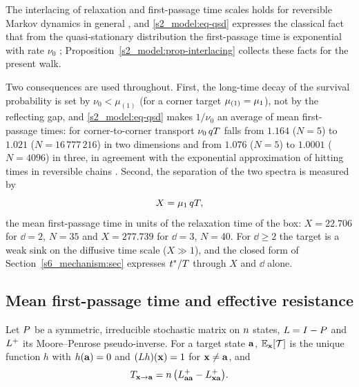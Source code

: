 The interlacing of relaxation and first-passage time scales holds for reversible Markov dynamics in general
\citep{HartichGodec2018,HartichGodec2019}, and \eqref{s2_model:eq-qsd} expresses the classical fact that from the
quasi-stationary distribution the first-passage time is exponential with rate $\nu_0$ \citep{AldousFill};
Proposition~\ref{s2_model:prop-interlacing} collects these facts for the present walk.

Two consequences are used throughout. First, the long-time decay of the survival probability is set by $\nu_0<\mu_{(1)}$
(for a corner target $\mu_{(1)}=\mu_{1}$), not by the reflecting gap, and \eqref{s2_model:eq-qsd} makes $1/\nu_0$ an average of mean first-passage times: for
corner-to-corner transport $\nu_0\,qT$ falls from $1.164$ ($N=5$) to $1.021$ ($N=16\,777\,216$) in two dimensions
and from $1.076$ ($N=5$) to $1.0001$ ($N=4096$) in three, in agreement with the exponential approximation of hitting
times in reversible chains \citep{AldousBrown1992,AldousFill}.
Second, the separation of the two spectra is measured by
\[
  X=\mu_{1}\,qT ,
\]
the mean first-passage time in units of the relaxation time of the box: $X=22.706$ for $\dd=2$, $N=35$ and
$X=277.739$ for $\dd=3$, $N=40$.
For $\dd\ge2$ the target is a weak sink on the diffusive time scale ($X\gg1$), and the closed form of
Section~\ref{s6_mechanism:sec} expresses $t^{*}/T$ through $X$ and $\dd$ alone.

\subsection{Mean first-passage time and effective resistance}\label{s2_model:ssec-pinv}

\begin{proposition}\label{s2_model:prop-pinv}
Let $P$ be a symmetric, irreducible stochastic matrix on $n$ states, $L=I-P$ and $L^{+}$ its Moore--Penrose
pseudo-inverse. For a target state $\mathbf{a}$, $\mathbb{E}_{\mathbf{x}}[\mathcal{T}]$ is the unique function $h$ with $h(\mathbf{a})=0$ and
$(L h)(\mathbf{x})=1$ for $\mathbf{x}\neq\mathbf{a}$, and
\begin{equation}\label{s2_model:eq-pinv}
  T_{\mathbf{x}\to\mathbf{a}}=n\,\bigl(L^{+}_{\mathbf{a}\mathbf{a}}-L^{+}_{\mathbf{x}\mathbf{a}}\bigr).
\end{equation}
\end{proposition}

